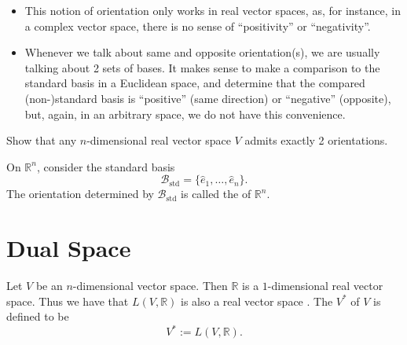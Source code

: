 \documentclass[notoc,notitlepage]{tufte-book}
\DeclareMathOperator{\std}{std}
\begin{document}
\begin{note}
  \begin{itemize}
    \item This notion of orientation only works in real vector spaces,
      as, for instance, in a complex vector space,
      there is no sense of ``positivity'' or ``negativity''.
    \item Whenever we talk about same and opposite orientation(s),
      we are usually talking about 2 sets of bases.
      It makes sense to make a comparison to the standard basis in a Euclidean space,
      and determine that the compared (non-)standard basis is
      ``positive'' (same direction) or ``negative'' (opposite),
      but, again, in an arbitrary space, we do not have this convenience.
  \end{itemize}
\end{note}

\begin{ex}[A1Q1]
  Show that any $n$-dimensional real vector space $V$ admits exactly 2 orientations.
\end{ex}

\begin{eg}
  On $\mathbb{R}^n$, consider the standard basis
  \begin{equation*}
    \mathcal{B}_{\std} = \{ \hat{e}_1, \ldots, \hat{e}_n \}.
  \end{equation*}
  The orientation determined by $\mathcal{B}_{\std}$ is called the  of $\mathbb{R}^n$.
\end{eg}


\section{Dual Space}%
\label{sec:dual_space}

\begin{defn}\label{defn:dual_space}
  Let $V$ be an $n$-dimensional vector space.
  Then $\mathbb{R}$ is a $1$-dimensional real vector space.
  Thus we have that $L(V, \mathbb{R})$ is also a real vector space
  .
  The  $V^*$ of $V$ is defined to be
  \begin{equation*}
    V^* := L(V, \mathbb{R}).
  \end{equation*}
\end{defn}
\end{document}
